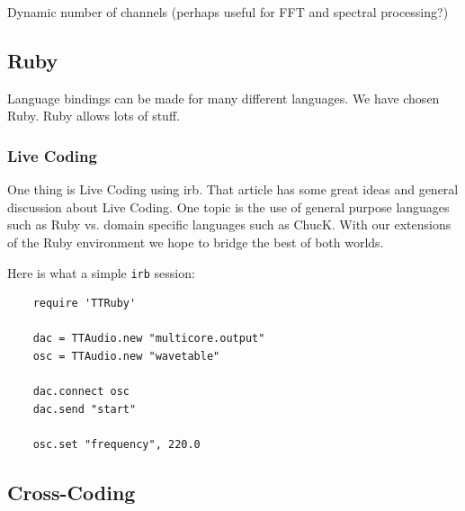 \documentclass[twoside,a4paper]{article}
\begin{document}
Dynamic number of channels (perhaps useful for FFT and spectral processing?)





\subsection{Ruby} %

Language bindings can be made for many different languages.  We have chosen Ruby.  Ruby allows lots of stuff.  

\subsubsection{Live Coding} %

One thing is Live Coding \cite{Collins:2003} using irb.  That article has some great ideas and general discussion about Live Coding.  One topic is the use of general purpose languages such as Ruby vs. domain specific languages such as ChucK.  With our extensions of the Ruby environment we hope to bridge the best of both worlds.


Here is what a simple \texttt{irb} session:

\begin{lstlisting}
	require 'TTRuby'
	
 	dac = TTAudio.new "multicore.output"
 	osc = TTAudio.new "wavetable"

	dac.connect osc
	dac.send "start"
	
	osc.set "frequency", 220.0
\end{lstlisting}




\subsection{Cross-Coding} %

\end{document}
